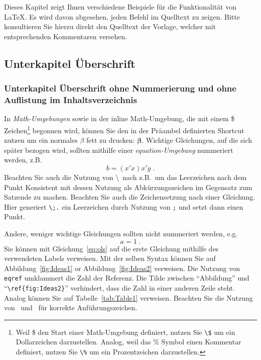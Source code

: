 \documentclass[a4paper,12pt]{scrartcl} %
\newcommand{\bs}{\boldsymbol}  %
\begin{document}
Dieses Kapitel zeigt Ihnen verschiedene Beispiele für die Funktionalität von \LaTeX. Es wird davon abgesehen, jeden Befehl im Quelltext zu zeigen. Bitte konsultieren Sie hierzu direkt den Quelltext der Vorlage, welcher mit entsprechenden Kommentaren versehen.

\subsection{Unterkapitel Überschrift} %

\subsubsection*{Unterkapitel Überschrift ohne Nummerierung und ohne Auflistung im Inhaltsverzeichnis} %

In \emph{Math-Umgebungen} sowie in der inline Math-Umgebung, die mit einem \$ Zeichen\footnote{Weil \$ den Start einer Math-Umgebung definiert, nutzen Sie \texttt{\textbackslash\$} um ein Dollarzeichen darzustellen. Analog, weil das \% Symbol einen Kommentar definiert, nutzen Sie \texttt{\textbackslash\%} um ein Prozentzeichen darzustellen.} begonnen wird, können Sie den in der Präambel definierten Shortcut nutzen um ein normales $\beta$ fett zu drucken: $\bs \beta$. Wichtige Gleichungen, auf die sich später bezogen wird, sollten mithilfe einer \emph{equation-Umgebung} nummeriert werden, z.B.\
\begin{equation}\label{eq:ols}
	b = (x'x)x'y \;.
\end{equation}
Beachten Sie auch die Nutzung von \textbackslash\ nach z.B.\ um das Leerzeichen nach dem Punkt Konsistent mit dessen Nutzung als Abkürzungszeichen im Gegensatz zum Satzende zu machen. Beachten Sie auch die Zeichensetzung nach einer Gleichung. Hier generiert \verb|\;.| ein Leerzeichen durch Nutzung von \verb|;| und setzt dann einen Punkt.

Andere, weniger wichtige Gleichungen sollten nicht nummeriert werden, e.g.\
\begin{equation*}
	a = 1\;.
\end{equation*}
Sie können mit Gleichung~\eqref{eq:ols} auf die erste Gleichung mithilfe des verwendeten Labels verweisen. Mit der selben Syntax können Sie auf Abbildung~\ref{fig:Ideas1} or Abbildung~\ref{fig:Ideas2} verweisen. Die Nutzung von \texttt{eqref} umklammert die Zahl der Referenz. Die Tilde zwischen ``Abbildung'' und ``\verb|\ref{fig:Ideas2}|'' verhindert, dass die Zahl in einer anderen Zeile steht. Analog können Sie auf Tabelle~\ref{tab:Table1} verweisen. Beachten Sie die Nutzung von \textasciigrave\textasciigrave\ und \textquotesingle\textquotesingle\ für korrekte Anführungszeichen.
\end{document}
